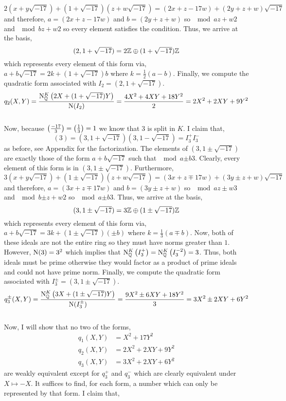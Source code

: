 \documentclass[12pt]{extarticle}
\begin{document}
\begin{enumerate}
\begin{enumerate}
\[2 (x + y \sqrt{-17}) + (1 + \sqrt{-17})(z + w \sqrt{-17}) = (2x + z - 17 w) +  (2 y + z + w) \sqrt{-17} \] 
and therefore, $a = (2 x + z - 17 w)$ and $b = (2y + z + w)$ so $\mod{a}{z + w}{2}$ and $\mod{b}{z + w}{2}$ so every element satisfies the condition. Thus, we arrive at the basis, 
\[(2, 1 + \sqrt{-17}) = 2 \mathbb{Z} \oplus (1 + \sqrt{-17}) \mathbb{Z}\]
which represents every element of this form via, $a + b \sqrt{-17} = 2k + (1 + \sqrt{-17})b$ where $k = \tfrac{1}{2}(a - b)$. Finally, we compute the quadratic form associated with $I_2 = (2, 1 + \sqrt{-17})$. 
\[ q_2(X, Y) = \frac{\mathrm{N}^{K}_{\mathbb{Q}}\left(2 X + (1 + \sqrt{-17}) Y\right)}{\mathrm{N}(I_2)} = \frac{4 X^2 + 4 XY + 18 Y^2}{2} = 2 X^2 + 2 XY + 9 Y^2\] \bigskip \\
Now, because $\left(\frac{-17}{3} \right) = \left(\frac{1}{3} \right) = 1$ we know that $3$ is split in $K$. I claim that,
\[(3) = (3, 1 + \sqrt{-17})(3, 1 - \sqrt{-17}) = I_3^{+} I_3^{-}\]
as before, see Appendix for the factorization. The elements of $(3, 1 \pm \sqrt{-17})$ are exactly those of the form $a + b \sqrt{-17}$ such that $\mod{a}{\pm b}{3}$. Clearly, every element of this form is in $(3, 1 \pm \sqrt{-17})$. Furthermore, 
\[3 (x + y \sqrt{-17}) + (1 \pm \sqrt{-17})(z + w \sqrt{-17}) = (3 x + z \mp 17 w) +  (3 y \pm z + w) \sqrt{-17} \] 
and therefore, $a = (3 x + z \mp 17 w)$ and $b = (3 y \pm z + w)$ so $\mod{a}{z \pm w}{3}$ and $\mod{b}{\pm z + w}{2}$ so $\mod{a}{\pm b}{3}$. Thus, we arrive at the basis, \[(3, 1 \pm \sqrt{-17}) = 3 \mathbb{Z} \oplus (1 \pm \sqrt{-17}) \mathbb{Z}\] which represents every element of this form via, $a + b \sqrt{-17} = 3k + (1 \pm \sqrt{-17})(\pm b)$ where $k = \tfrac{1}{3}(a \mp b)$. Now, both of these ideals are not the entire ring so they must have norms greater than $1$. However, $\mathrm{N}(3) = 3^2$ which implies that $\mathrm{N}^{K}_{\mathbb{Q}}\left(I_3^{+}\right) = \mathrm{N}^{K}_{\mathbb{Q}}\left(I_3^{-2}\right) = 3$. Thus, both ideals must be prime otherwise they would factor as a product of prime ideals and could not have prime norm. Finally, we compute the quadratic form associated with $I_3^{\pm} = (3, 1 \pm \sqrt{-17})$. 
\[ q_3^{\pm}(X, Y) = \frac{\mathrm{N}^{K}_{\mathbb{Q}}\left(3 X + (1 \pm \sqrt{-17}) Y\right)}{\mathrm{N}(I_3^{\pm})} = \frac{9 X^2 \pm 6 XY + 18 Y^2}{3} = 3 X^2 \pm 2 XY + 6 Y^2\] \bigskip \\
Now, I will show that no two of the forms,
\begin{align*}
q_1(X,Y) & = X^2 + 17 Y^2 \\
q_2(X, Y) & = 2 X^2 + 2 XY + 9 Y^2 \\
q_3(X, Y) & = 3 X^2 + 2 XY + 6 Y^2
\end{align*}
are weakly equivalent except for $q_3^{+}$ and $q_3^{-}$ which are clearly equivalent under $X \mapsto - X$. It suffices to find, for each form, a number which can only be represented by that form. I claim that,

\end{enumerate}
\end{enumerate}
\end{document}
